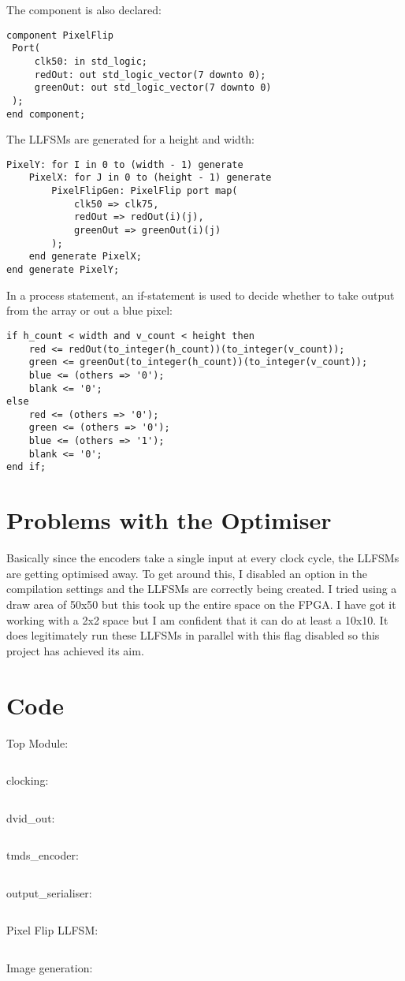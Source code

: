 \documentclass{article}
\begin{document}
		The component is also declared:
		
		\begin{verbatim}
component PixelFlip
 Port(
     clk50: in std_logic;
     redOut: out std_logic_vector(7 downto 0);
     greenOut: out std_logic_vector(7 downto 0)
 );
end component;
		\end{verbatim}
		
		The LLFSMs are generated for a height and width:
		
		\begin{verbatim}
PixelY: for I in 0 to (width - 1) generate
    PixelX: for J in 0 to (height - 1) generate
        PixelFlipGen: PixelFlip port map(
            clk50 => clk75,
            redOut => redOut(i)(j),
            greenOut => greenOut(i)(j)
        );			
    end generate PixelX;
end generate PixelY;
		\end{verbatim}
		
		In a process statement, an if-statement is used to decide whether to take output from the array or out a blue pixel:
		
		\begin{verbatim}
if h_count < width and v_count < height then
    red <= redOut(to_integer(h_count))(to_integer(v_count));
    green <= greenOut(to_integer(h_count))(to_integer(v_count));
    blue <= (others => '0');
    blank <= '0';
else
    red <= (others => '0');
    green <= (others => '0');
    blue <= (others => '1');
    blank <= '0';
end if;
		\end{verbatim}
	\section{Problems with the Optimiser}
		Basically since the encoders take a single input at every clock cycle, the LLFSMs are getting optimised away. To get around this, I disabled an option in the compilation settings and the LLFSMs are correctly being created. I tried using a draw area of 50x50 but this took up the entire space on the FPGA. I have got it working with a 2x2 space but I am confident that it can do at least a 10x10. It does legitimately run these LLFSMs in parallel with this flag disabled so this project has achieved its aim.
	\section{Code}
		Top Module:
		\inputminted{vhdl}{../../projects/PixelFlip/dvid_serdes.vhd}
		clocking:
		\inputminted{vhdl}{../../projects/PixelFlip/clocking.vhd}
		dvid\_out:
		\inputminted{vhdl}{../../projects/PixelFlip/dvid_out.vhd}
		tmds\_encoder:
		\inputminted{vhdl}{../../projects/PixelFlip/tmds_encoder.vhd}
		output\_serialiser:
		\inputminted{vhdl}{../../projects/PixelFlip/output_serialiser.vhd}
		Pixel Flip LLFSM:
		\inputminted{vhdl}{../../projects/PixelFlip/PixelFlip.vhd}		
		Image generation:
		\inputminted{vhdl}{../../projects/PixelFlip/vga_gen.vhd}		
\end{document}
